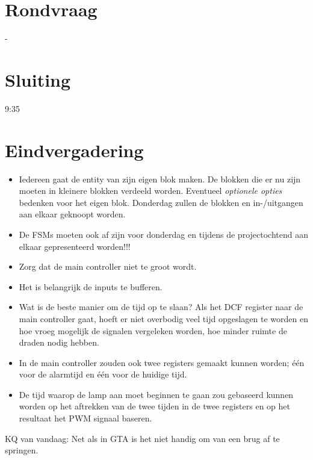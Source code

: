 \documentclass[11pt,twoside,a4paper]{article}
\begin{document}
\section{Rondvraag}
-

\section{Sluiting}
9:35

\section{Eindvergadering}
\begin{itemize}
\item Iedereen gaat de entity van zijn eigen blok maken. De blokken die er nu zijn moeten in kleinere blokken verdeeld worden. Eventueel \emph{optionele opties} bedenken voor het eigen blok. Donderdag zullen de blokken en in-/uitgangen aan elkaar geknoopt worden.\\
\item De FSMs moeten ook af zijn voor donderdag en tijdens de projectochtend aan elkaar gepresenteerd worden!!!
\item Zorg dat de main controller niet te groot wordt.\\
\item Het is belangrijk de inputs te bufferen.\\
\item Wat is de beste manier om de tijd op te slaan? Als het DCF register naar de main controller gaat, hoeft er niet overbodig veel tijd opgeslagen te worden en hoe vroeg mogelijk de signalen vergeleken worden, hoe minder ruimte de draden nodig hebben.
\item In de main controller zouden ook twee registers gemaakt kunnen worden; \'e\'en voor de alarmtijd en \'e\'en voor de huidige tijd.
\item De tijd waarop de lamp aan moet beginnen te gaan zou gebaseerd kunnen worden op het aftrekken van de twee tijden in de twee registers en op het resultaat het PWM signaal baseren.
\end{itemize}

\vfill
KQ van vandaag: Net als in GTA is het niet handig om van een brug af te springen.
\end{document}
